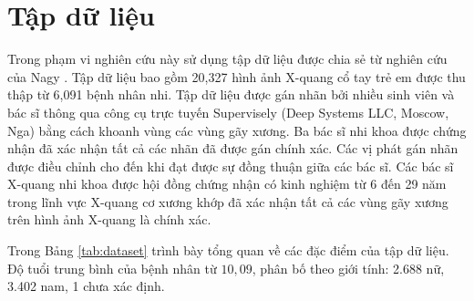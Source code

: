 \documentclass[../the.tex]{subfiles}
\begin{document}
\section{Tập dữ liệu}
\label{sec:dataset}

{\fontsize{13}{12} \selectfont
Trong phạm vi nghiên cứu này sử dụng tập dữ liệu được chia sẻ từ nghiên cứu của Nagy \etal \cite{Nagy2022}. Tập dữ liệu bao gồm 20,327 hình ảnh X-quang cổ tay trẻ em được thu thập từ 6,091 bệnh nhân nhi. Tập dữ liệu được gán nhãn bởi nhiều sinh viên và bác sĩ thông qua công cụ trực tuyến Supervisely (Deep Systems LLC, Moscow, Nga) bằng cách khoanh vùng các vùng gãy xương. Ba bác sĩ nhi khoa được chứng nhận đã xác nhận tất cả các nhãn đã được gán chính xác. Các vị phát gán nhãn được điều chỉnh cho đến khi đạt được sự đồng thuận giữa các bác sĩ. Các bác sĩ X-quang nhi khoa được hội đồng chứng nhận có kinh nghiệm từ 6 đến 29 năm trong lĩnh vực X-quang cơ xương khớp đã xác nhận tất cả các vùng gãy xương trên hình ảnh X-quang là chính xác.

Trong Bảng \ref{tab:dataset} trình bày tổng quan về các đặc điểm của tập dữ liệu. Độ tuổi trung bình của bệnh nhân từ $10,09$, phân bố theo giới tính: 2.688 nữ, 3.402 nam, 1 chưa xác định.

}
\end{document}
